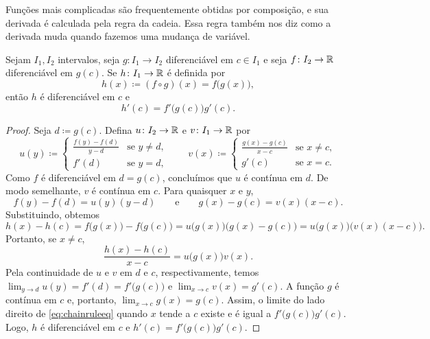 Funções mais complicadas são frequentemente obtidas por composição,
e sua derivada é calculada pela regra da cadeia. Essa regra também nos diz
como a derivada muda quando fazemos uma mudança de variável.

\begin{prop}
Sejam $I_1, I_2$ intervalos, seja
$g \colon I_1 \to I_2$ diferenciável em $c \in I_1$
e seja
$f \colon I_2 \to {\mathbb{R}}$ diferenciável em $g(c)$.
Se $h \colon I_1 \to {\mathbb{R}}$ é definida por
\begin{equation*}
h(x) \coloneqq (f \circ g) (x) = f\bigl(g(x)\bigr) ,
\end{equation*}
então $h$ é diferenciável em $c$ e
\begin{equation*}
h'(c) = f'\bigl(g(c)\bigr)g'(c) .
\end{equation*}
\end{prop}

\begin{proof}
Seja $d \coloneqq g(c)$. Defina
$u \colon I_2 \to {\mathbb{R}}$ e $v \colon I_1 \to {\mathbb{R}}$ por
\begin{equation*}
u(y) \coloneqq
\begin{cases}
 \frac{f(y) - f(d)}{y-d}  & \text{se } y \neq d, \\
 f'(d)                    & \text{se } y = d,
\end{cases}
\qquad
v(x) \coloneqq
\begin{cases}
 \frac{g(x) - g(c)}{x-c} & \text{se } x \neq c, \\
 g'(c)                   & \text{se } x = c.
\end{cases}
\end{equation*}
Como $f$ é diferenciável em $d = g(c)$, concluímos que
$u$ é contínua em $d$. De modo semelhante, $v$ é contínua em $c$.
Para quaisquer $x$ e $y$,
\begin{equation*}
f(y)-f(d) = u(y) (y-d)
\qquad \text{e} \qquad
g(x)-g(c) = v(x) (x-c) .
\end{equation*}
Substituindo, obtemos
\begin{equation*}
h(x)-h(c)
=
f\bigl(g(x)\bigr)-f\bigl(g(c)\bigr)
=
u\bigl( g(x) \bigr) \bigl(g(x)-g(c)\bigr)
=
u\bigl( g(x) \bigr) \bigl(v(x) (x-c)\bigr) .
\end{equation*}
Portanto, se $x \neq c$,
\begin{equation} \label{eq:chainruleeq}
\frac{h(x)-h(c)}{x-c}
=
u\bigl( g(x) \bigr) v(x) .
\end{equation}
Pela continuidade de $u$ e $v$ em $d$ e $c$, respectivamente, temos
$\lim_{y \to d} u(y)
= f'(d) = f'\bigl(g(c)\bigr)$ e
$\lim_{x \to c} v(x) = g'(c)$.
A função $g$ é contínua em $c$ e, portanto, $\lim_{x \to c} g(x) = g(c)$.
Assim, o limite do lado direito de \eqref{eq:chainruleeq}
quando $x$ tende a $c$ existe e é igual a $f'\bigl(g(c)\bigr) g'(c)$. Logo, $h$
é diferenciável em $c$ e $h'(c) = f'\bigl(g(c)\bigr)g'(c)$.
\end{proof}

